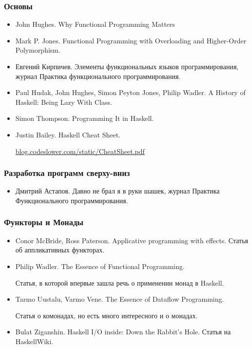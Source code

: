 \subsubsection{Основы}

\begin{itemize}
\item John Hughes. Why Functional Programming Matters

\item Mark P. Jones. Functional Programming with Overloading
    and Higher-Order Polymorphism.

\item Евгений Кирпичев. Элементы функциональных 
    языков программирования, журнал Практика функционального
    программирования.

\item Paul Hudak, John Hughes, Simon Peyton Jones, Philip Wadler.
    A History of Haskell: Being Lazy With Class.

\item Simon Thompson. Programming It in Haskell.

\item Justin Bailey. Haskell Cheat Sheet.

    \url{blog.codeslower.com/static/CheatSheet.pdf}

\end{itemize}


\subsubsection{Разработка программ сверху-вниз}

\begin{itemize}
\item Дмитрий Астапов. Давно не брал я в руки шашек,
    журнал Практика Функционального программирования.
\end{itemize}


\subsubsection{Функторы и Монады}

\begin{itemize}
\item Conor McBride, Ross Paterson. Applicative programming with effects.
    Статья об аппликативных функторах.

\item Philip Wadler. The Essence of Functional Programming.
     
    Статья, в которой впервые зашла речь о применении монад
        в Haskell.

\item Tarmo Uustalu, Varmo Vene. The Essence of Dataflow Programming.
    
    Статья о комонадах, но есть много интересного и о монадах.

\item Bulat Ziganshin. Haskell I/O inside: Down the Rabbit's Hole. 
    Статья на HaskellWiki.

\end{itemize}

